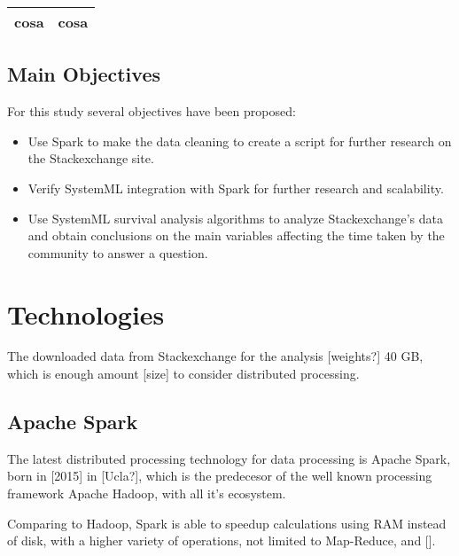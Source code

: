 \documentclass[11pt]{article} %
\begin{document}
    \begin{table}
      \centering
      \begin{tabular}{|c|c|}
        \hline
        cosa & cosa \\ \hline
      \end{tabular}
      \caption{}
      \label{}
    \end{table}

  \subsection{Main Objectives}

    For this study several objectives have been proposed:

    \begin{itemize}

      \item Use Spark to make the data cleaning to create a script for further research on the Stackexchange site.

      \item Verify SystemML integration with Spark for further research and scalability.

      \item Use SystemML survival analysis algorithms to analyze Stackexchange's data and obtain conclusions on the main variables affecting the time taken by the community to answer a question.

    \end{itemize}

\section{Technologies}

  The downloaded data from Stackexchange for the analysis [weights?] 40 GB, which is enough amount [size] to consider distributed processing.

  \subsection{Apache Spark}

    The latest distributed processing technology for data processing is Apache Spark, born in [2015] in [Ucla?], which is the predecesor of the well known processing framework Apache Hadoop, with all it's ecosystem.

    Comparing to Hadoop, Spark is able to speedup calculations using RAM instead of disk, with a higher variety of operations, not limited to Map-Reduce,  and [].
\end{document}
